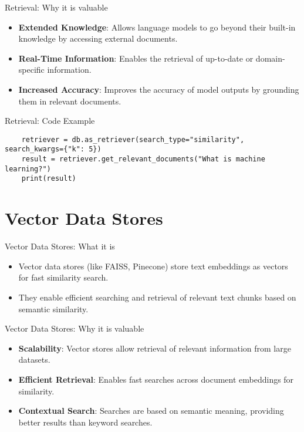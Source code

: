 \documentclass{beamer}
\begin{document}
\begin{frame}{Retrieval: Why it is valuable}
    \begin{itemize}
        \item \textbf{Extended Knowledge}: Allows language models to go beyond their built-in knowledge by accessing external documents.
        \item \textbf{Real-Time Information}: Enables the retrieval of up-to-date or domain-specific information.
        \item \textbf{Increased Accuracy}: Improves the accuracy of model outputs by grounding them in relevant documents.
    \end{itemize}
\end{frame}

\begin{frame}[fragile]{Retrieval: Code Example}
    \begin{verbatim}
    retriever = db.as_retriever(search_type="similarity", search_kwargs={"k": 5})
    result = retriever.get_relevant_documents("What is machine learning?")
    print(result)
    \end{verbatim}
\end{frame}

\section{Vector Data Stores}

\begin{frame}{Vector Data Stores: What it is}
    \begin{itemize}
        \item Vector data stores (like FAISS, Pinecone) store text embeddings as vectors for fast similarity search.
        \item They enable efficient searching and retrieval of relevant text chunks based on semantic similarity.
    \end{itemize}
\end{frame}

\begin{frame}{Vector Data Stores: Why it is valuable}
    \begin{itemize}
        \item \textbf{Scalability}: Vector stores allow retrieval of relevant information from large datasets.
        \item \textbf{Efficient Retrieval}: Enables fast searches across document embeddings for similarity.
        \item \textbf{Contextual Search}: Searches are based on semantic meaning, providing better results than keyword searches.
    \end{itemize}
\end{frame}
\end{document}
